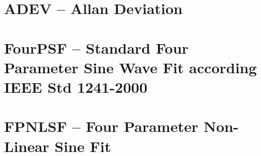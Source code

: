 \documentclass[12pt,a4paper,oneside]{report} %
\begin{document}
\chapter{ADEV -- Allan Deviation} %
\section*{\infosection} %

\section*{\examplesection} %


\chapter{FourPSF -- Standard Four Parameter Sine Wave Fit according IEEE Std 1241-2000} %
\section*{\infosection} %

\section*{\examplesection} %


\chapter{FPNLSF -- Four Parameter Non-Linear Sine Fit} %
\section*{\infosection} %

\end{document}
